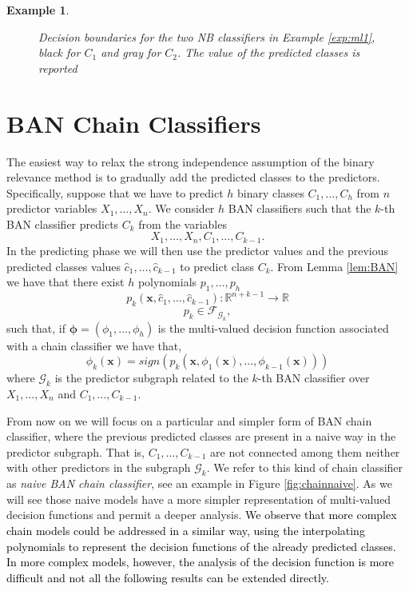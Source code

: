 \documentclass[11pt,a4paper, twoside]{book}
\newtheorem{example}{Example}[chapter]
\begin{document}
\begin{example}
\begin{figure}[h!]
\caption{Decision boundaries for the two NB classifiers in Example \ref{exp:ml1}, black for $C_1$ and gray for $C_2$. The value of the predicted classes is reported}
\label{fig:decbound}
\end{figure}
\end{example}
\section{BAN Chain Classifiers}
\label{sec:chain}
The easiest way to relax the strong independence assumption of the binary relevance method is to gradually add the predicted classes to the predictors. Specifically, suppose that we have to predict $h$ binary classes $C_1,\ldots,C_{h}$ from $n$ predictor variables $X_1,\ldots,X_n$.
We consider $h$ BAN classifiers such that the $k$-th BAN classifier predicts $C_k$ from the variables $$X_1,\ldots,X_n,C_1,\ldots,C_{k-1}.$$
{In the predicting phase we will then use the predictor values and the previous predicted classes values $\hat{c}_1,\ldots,\hat{c}_{k-1}$ to predict class $C_k$.}
From Lemma \ref{lem:BAN} we have that there exist $h$ polynomials $p_1,\ldots,p_{h}$ 
\[ p_k(\mathbf{x},\hat{c}_1,\ldots,\hat{c}_{k-1}): \mathbb{R}^{n+k-1} \to \mathbb{R} \]
\[ p_k \in \mathcal{F}_{\mathcal{G}_k}, \]
such that, if ${\bm{\phi}}=(\phi_1,\ldots,\phi_h)$ is the multi-valued decision function associated with a chain classifier we have that, 
\begin{equation}
\label{eq:chainpolynomial} \phi_k(\mathbf{x})=sign(p_k(\mathbf{x},\phi_1(\mathbf{x}),\ldots,\phi_{k-1}(\mathbf{x})))\end{equation}
where $\mathcal{G}_k$ is the predictor subgraph related to the $k$-th BAN classifier over  $X_1,\ldots,X_n$ and $C_1,\ldots,C_{k-1}$.

From now on we will focus on a particular and simpler form of BAN chain classifier, where the previous predicted classes are present in a naive way in the predictor subgraph. That is, $C_1,\ldots,C_{k-1}$ are not connected among them neither with other predictors in the subgraph $\mathcal{G}_k$.
We refer to this kind of chain classifier as \textit{naive BAN chain classifier}, see an example in Figure \ref{fig:chainnaive}.
As we will see those naive models have a more simpler representation of multi-valued decision functions and permit a deeper analysis. \textcolor{black}{We observe that more complex chain models could be addressed in a similar way, using the interpolating polynomials to represent the decision functions of the already predicted classes. In more complex models, however, the analysis of the decision function is more difficult and not all the following results can be extended directly. }
 
\end{document}
